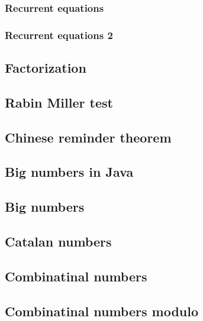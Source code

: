\documentclass[a4paper]{article}
\begin{document}
\begin{multicols*}{2}
        \subsubsection{Recurrent equations}
            
        \subsubsection{Recurrent equations 2}
            
    \subsection{Factorization}
        
    \subsection{Rabin Miller test}
        
    \subsection{Chinese reminder theorem}
        
    \subsection{Big numbers in Java}
        
    \subsection{Big numbers}
        
    \subsection{Catalan numbers}
        
    \subsection{Combinatinal numbers}
        
    \subsection{Combinatinal numbers modulo}
        

\end{multicols*}
\end{document}
